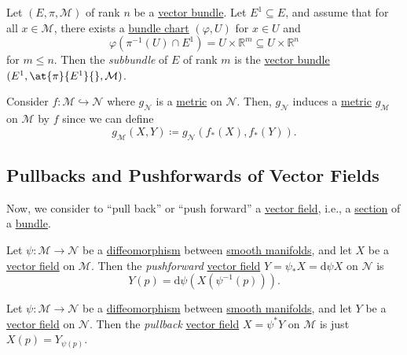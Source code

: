 \begin{definition}[Subbundle]\label{def:subbundle}
	Let \((E, \pi , \mathcal{M} )\) of rank \(n\) be a \hyperref[def:vector-bundle]{vector bundle}. Let \(E^1 \subseteq E\), and assume that for all \(x\in \mathcal{M} \), there exists a \hyperref[def:bundle-chart]{bundle chart} \((\varphi , U)\) for \(x\in U\) and
	\[
		\varphi (\pi ^{-1} (U) \cap E^1) = U \times \mathbb{R} ^m \subseteq U \times \mathbb{R} ^n
	\]
	for \(m \leq n\). Then the \emph{subbundle} of \(E\) of rank \(m\) is the \hyperref[def:vector-bundle]{vector bundle} \((E^1, \at{\pi }{E^1}{}, \mathcal{M} )\).
\end{definition}

\begin{eg}
	Consider \(f\colon \mathcal{M} \hookrightarrow \mathcal{N} \) where \(g_{\mathcal{N} } \) is a \hyperref[def:pseudo-Riemannian-metric]{metric} on \(\mathcal{N} \). Then, \(g_{\mathcal{N} } \) induces a \hyperref[def:pseudo-Riemannian-metric]{metric} \(g_{\mathcal{M} } \) on \(\mathcal{M} \) by \(f\) since we can define
	\[
		g_{\mathcal{M} } (X, Y) \coloneqq g_{\mathcal{N} } (f_{\ast} (X), f_{\ast} (Y)).
	\]
\end{eg}

\subsection{Pullbacks and Pushforwards of Vector Fields}
Now, we consider to ``pull back'' or ``push forward'' a \hyperref[def:vector-field]{vector field}, i.e., a \hyperref[def:section]{section} of a \hyperref[def:bundle]{bundle}.

\begin{definition}[Pushforward]\label{def:pushforward}
	Let \(\psi \colon \mathcal{M} \to \mathcal{N} \) be a \hyperref[def:diffeomorphism]{diffeomorphism} between \hyperref[def:smooth-manifold]{smooth manifolds}, and let \(X\) be a \hyperref[def:vector-field]{vector field} on \(\mathcal{M} \). Then the \emph{pushforward} \hyperref[def:vector-field]{vector field} \(Y = \psi _\ast X = \mathrm{d} \psi X\) on \(\mathcal{N} \) is
	\[
		Y(p) = \mathrm{d} \psi (X(\psi ^{-1} (p))).
	\]
\end{definition}

\begin{definition}[Pullback]\label{def:pullback}
	Let \(\psi \colon \mathcal{M} \to \mathcal{N} \) be a \hyperref[def:diffeomorphism]{diffeomorphism} between \hyperref[def:smooth-manifold]{smooth manifolds}, and let \(Y\) be a \hyperref[def:vector-field]{vector field} on \(\mathcal{N} \). Then the \emph{pullback} \hyperref[def:vector-field]{vector field} \(X = \psi ^\ast Y\) on \(\mathcal{M} \) is just \(X(p) = Y_{\psi (p)}\).
\end{definition}

